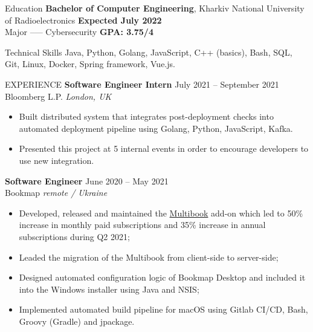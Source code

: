 \documentclass{resume} %
\begin{document}

\begin{rSection}{Education}
{\bf Bachelor of  Computer Engineering}, Kharkiv National University of Radioelectronics \hfill {\bf Expected July 2022}\\
Major --— Cybersecurity \hfill {\bf GPA: 3.75/4}
\end{rSection}
\begin{rSection}{Technical Skills}
Java, Python, Golang, JavaScript, C++ (basics), Bash, SQL, Git, Linux, Docker, Spring framework, Vue.js.
\end{rSection}
\begin{rSection}{EXPERIENCE}
\vspace{1mm}
\textbf{Software Engineer Intern} \hfill July 2021 -- September 2021\\
Bloomberg L.P. \hfill \textit{London, UK}\\
\vspace{-3.5mm}
 \begin{itemize}[topsep=2pt, partopsep=0pt, itemsep=7pt,parsep=-5pt]
     \item Built distributed system that integrates post-deployment checks into automated deployment pipeline using Golang, Python, JavaScript, Kafka.
    \item Presented this project at 5 internal events in order to encourage developers to use new integration.
 \end{itemize}

\textbf{Software Engineer} \hfill June 2020 -- May 2021\\
Bookmap \hfill \textit{remote / Ukraine}
 \begin{itemize}[topsep=2pt, itemsep=7pt,parsep=-5pt]
     \item Developed, released and maintained the \href{{https://bookmap.com/knowledgebase/docs/Addons-Multibook}}{Multibook} add-on which led to 50\% increase in monthly paid subscriptions and 35\% increase in annual subscriptions during Q2 2021;
     \item Leaded the migration of the Multibook from client-side to server-side;
     \item Designed automated configuration logic of Bookmap Desktop and included it into the Windows installer using Java and NSIS;
    \item Implemented automated build pipeline for macOS using Gitlab CI/CD, Bash, Groovy (Gradle) and jpackage. 
 \end{itemize}
 

\end{rSection}
\end{document}
